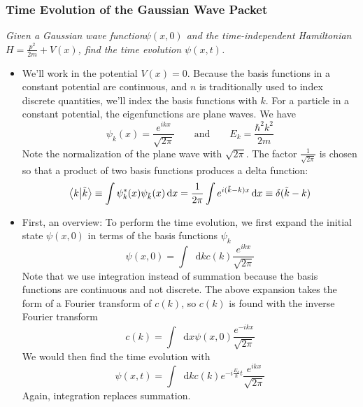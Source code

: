 \documentclass[11pt, a4paper]{article}
\newcommand{\diff}{\mathop{}\!\mathrm{d}} %
\newcommand{\eqtext}[1]{\qquad \text{#1} \qquad}
\begin{document}
\subsubsection{Time Evolution of the Gaussian Wave Packet}
\textit{Given a Gaussian wave function$ \psi(x, 0) $ and the time-independent Hamiltonian $ H = \frac{p^{2}}{2m} + V(x) $, find the time evolution $ \psi(x, t) $.}

\begin{itemize}
	\item We'll work in the potential $ V(x) = 0$. Because the basis functions in a constant potential are continuous, and $ n $ is traditionally used to index discrete quantities, we'll index the basis functions with $ k $. For a particle in a constant potential, the eigenfunctions are plane waves. We have
	\begin{equation*}
		\psi_{k}(x) = \frac{e^{ikx}}{\sqrt{2\pi}} \eqtext{and} E_{k} = \frac{\hbar^{2}k^{2}}{2m}
	\end{equation*}
	Note the normalization of the plane wave with $ \sqrt{2\pi} $. The factor $ \frac{1}{\sqrt{2\pi}} $ is chosen so that a product of two basis functions produces a delta function:
	\begin{equation*}
		\braket{k}{\tilde{k}} \equiv \int \psi_{k}^{*}(x)\psi_{\tilde{k}}(x)\diff x = \frac{1}{2\pi} \int e^{i(\tilde{k}-k)x}\diff x \equiv \delta(\tilde{k} - k)
	\end{equation*}
	
	\item First, an overview: To perform the time evolution, we first expand the initial state $ \psi(x, 0) $ in terms of the basis functions $ \psi_{k} $
	\begin{equation*}
		\psi(x, 0) = \int \diff k c(k)\frac{e^{ikx}}{\sqrt{2\pi}}
	\end{equation*}
	Note that we use integration instead of summation because the basis functions are continuous and not discrete. The above expansion takes the form of a Fourier transform of $ c(k) $, so $ c(k) $ is found with the inverse Fourier transform
	\begin{equation*}
		c(k) = \int \diff x \psi(x, 0)\frac{e^{-ikx}}{\sqrt{2\pi}}
	\end{equation*}
	We would then find the time evolution with
	\begin{equation*}
		\psi(x, t) = \int \diff k c(k)e^{-i\frac{E_{k}}{\hbar}t}\frac{e^{ikx}}{\sqrt{2\pi}}
	\end{equation*}
	Again, integration replaces summation.
	

\end{itemize}
\end{document}
